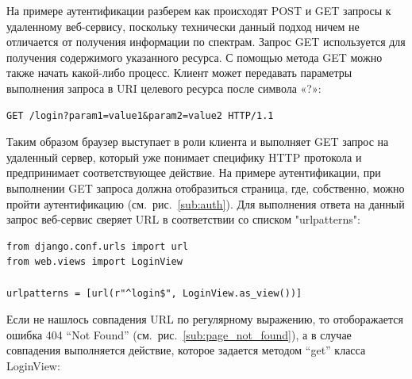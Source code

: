 На примере аутентификации разберем как происходят POST и GET запросы к удаленному веб-сервису, поскольку технически
данный подход ничем не отличается от получения информации по спектрам. Запрос GET используется для получения
содержимого указанного ресурса. С помощью метода GET можно также начать какой-либо процесс. Клиент может передавать
параметры выполнения запроса в URI целевого ресурса после символа «?»:
\begin{verbatim}
GET /login?param1=value1&param2=value2 HTTP/1.1
\end{verbatim}
Таким образом браузер выступает в роли клиента и выполняет GET запрос на удаленный сервер, который уже понимает специфику
HTTP протокола и предпринимает соответствующее действие. На примере аутентификации, при выполнении GET запроса должна
отобразиться страница, где, собственно, можно пройти аутентификацию (см.~рис.~\ref{sub:auth}). Для выполнения ответа
на данный запрос веб-сервис сверяет URL в соответствии со списком "urlpatterns":
\begin{lstlisting}[style=py]
from django.conf.urls import url
from web.views import LoginView

urlpatterns = [url(r"^login$", LoginView.as_view())]
\end{lstlisting}
Если не нашлось совпадения URL по регулярному выражению, то отоборажается ошибка 404 “Not Found” (см.~рис.~\ref{sub:page_not_found}),
а в случае совпадения выполняется действие, которое задается методом “get” класса LoginView:
